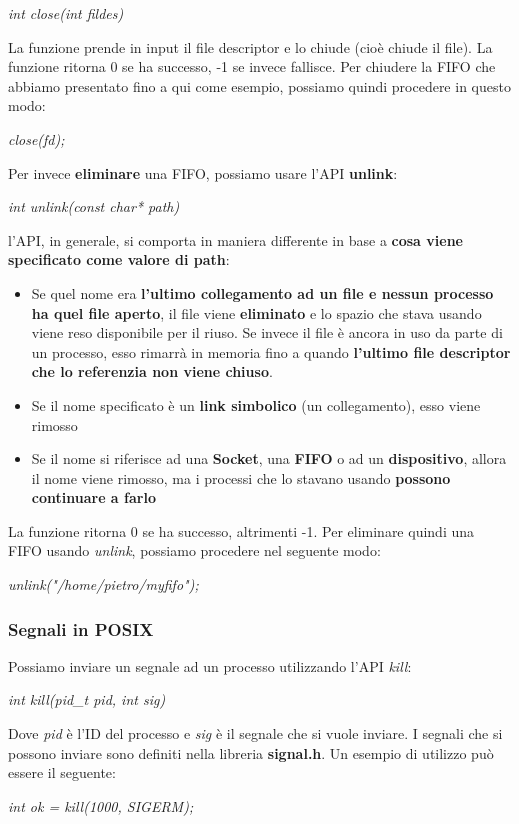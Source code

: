 \documentclass[12pt]{article}
\begin{document}
\begin{center}
    \textit{int close(int fildes)}
\end{center}
La funzione prende in input il file descriptor e lo chiude (cioè chiude il file).
La funzione ritorna 0 se ha successo, -1 se invece fallisce. Per chiudere la FIFO che abbiamo presentato fino a qui come esempio,
possiamo quindi procedere in questo modo:
\begin{center}
    \textit{close(fd);}
\end{center}
Per invece \textbf{eliminare} una FIFO, possiamo usare l'API \textbf{unlink}:
\begin{center}
    \textit{int unlink(const char* path)}
\end{center}
l'API, in generale, si comporta in maniera differente in base a \textbf{cosa viene specificato come valore di path}:
\begin{itemize}
    \item Se quel nome era \textbf{l'ultimo collegamento ad un file e nessun processo ha quel file aperto}, il file viene \textbf{eliminato} e lo spazio che stava usando viene reso disponibile per il riuso.
    Se invece il file è ancora in uso da parte di un processo, esso rimarrà in memoria fino a quando \textbf{l'ultimo file descriptor che lo referenzia non viene chiuso}.
    \item Se il nome specificato è un \textbf{link simbolico} (un collegamento), esso viene rimosso
    \item Se il nome si riferisce ad una \textbf{Socket}, una \textbf{FIFO} o ad un \textbf{dispositivo}, allora il nome viene rimosso, ma i processi che lo stavano usando \textbf{possono continuare a farlo}
\end{itemize} 
La funzione ritorna 0 se ha successo, altrimenti -1. Per eliminare quindi una FIFO usando \textit{unlink}, possiamo procedere nel seguente modo:
\begin{center}
    \textit{unlink("/home/pietro/myfifo");}
\end{center}
\subsubsection{Segnali in POSIX}
Possiamo inviare un segnale ad un processo utilizzando l'API \textit{kill}:
\begin{center}
    \textit{int kill(pid\_t pid, int sig)}
\end{center}
Dove \textit{pid} è l'ID del processo e \textit{sig} è il segnale che si vuole inviare.
I segnali che si possono inviare sono definiti nella libreria \textbf{signal.h}.
Un esempio di utilizzo può essere il seguente:
\begin{center}
    \textit{int ok = kill(1000, SIGERM);}
\end{center}
\end{document}
